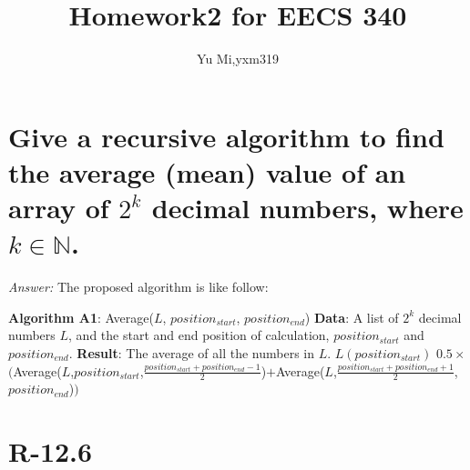 \documentclass[11pt]{article}
\begin{document}
	\title{Homework2 for EECS 340}
	\author{Yu Mi,yxm319}
	\maketitle
\section{Give a recursive algorithm to find the average (mean) value of an array of $2^k$ decimal numbers, where $k\in \mathbb{N}$.}
	\emph{Answer:} The proposed algorithm is like follow:
	
	\begin{algorithmic}
	\State \textbf{Algorithm A1}: Average($L$, $position_{start}$, $position_{end}$)
	\State \textbf{Data}: A list of $2^k$ decimal numbers $L$, and the start and end position of calculation, $position_{start}$ and $position_{end}$.
	\State \textbf{Result}: The average of all the numbers in $L$.
		\State \Return $L(position_{start})$
	\Else
		\State \Return $0.5\times$ $($Average($L$,$position_{start}$,$\frac{position_{start}+position_{end}-1}{2}$)$+$Average($L$,$\frac{position_{start}+position_{end}+1}{2}$,$position_{end}$)$)$
	\EndIf
	\end{algorithmic}
\section{R-12.6}
	
\end{document}
